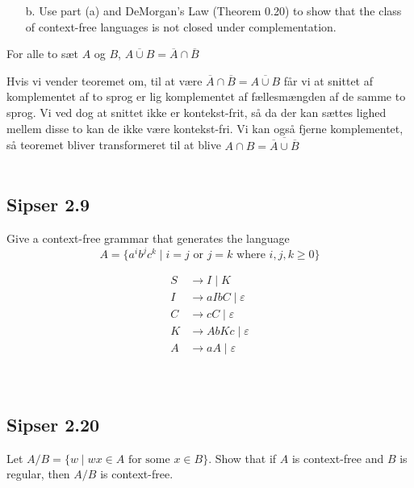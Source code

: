 \begin{enumerate}
  \item[b.] Use part (a) and DeMorgan's Law (Theorem 0.20) to show that the class of context-free languages is not closed under complementation.
\end{enumerate}

\begin{theorem}
For alle to sæt $A$ og $B$, $\overline{A \cup B} = \overline{A} \cap \overline{B}$
\end{theorem}

Hvis vi vender teoremet om, til at være $\overline{A} \cap \overline{B} = \overline{A \cup B}$ får vi at snittet af komplementet af to sprog er lig komplementet af fællesmængden af de samme to sprog. Vi ved dog at snittet ikke er kontekst-frit, så da der kan sættes lighed mellem disse to kan de ikke være kontekst-fri. Vi kan også fjerne komplementet, så teoremet bliver transformeret til at blive $A \cap B = \overline{\overline{A} \cup \overline{B}}$\\\\

\noindent
\subsection*{Sipser 2.9}
\noindent
Give a context-free grammar that generates the language
\[ A = \{a^{i}b^{j}c^{k}\; | \; i = j \text{ or }j = k \text{ where } i,j,k \ge 0 \}\]

\begin{equation*}
  \begin{split}
    S &\rightarrow I\;|\;K \\
    I &\rightarrow aIbC\;|\; \varepsilon\\
    C &\rightarrow cC\;|\; \varepsilon\\
    K &\rightarrow AbKc \;| \; \varepsilon\\
    A &\rightarrow aA \; | \; \varepsilon
  \end{split}
\end{equation*}
\\\\

\noindent
\subsection*{Sipser 2.20}
\noindent
Let $A/B = \{w \; | \; wx \in A \text{ for some }x \in B\}$. Show that if $A$ is context-free and $B$ is regular, then $A/B$ is context-free.

